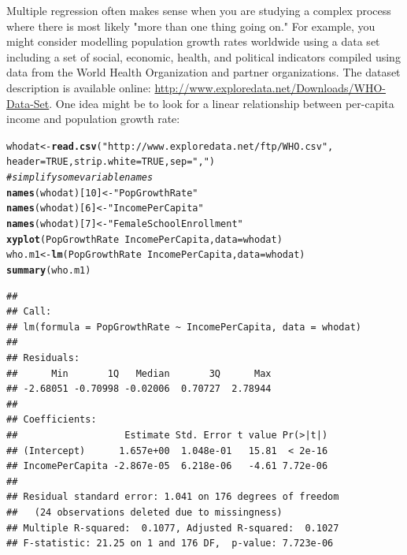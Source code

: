 \documentclass[twoside]{book}\usepackage[]{graphicx}\usepackage[]{xcolor}
\makeatletter
\newcommand{\hlnum}[1]{\textcolor[rgb]{0.686,0.059,0.569}{#1}}%
\newcommand{\hlstr}[1]{\textcolor[rgb]{0.192,0.494,0.8}{#1}}%
\newcommand{\hlcom}[1]{\textcolor[rgb]{0.678,0.584,0.686}{\textit{#1}}}%
\newcommand{\hlopt}[1]{\textcolor[rgb]{0,0,0}{#1}}%
\newcommand{\hlstd}[1]{\textcolor[rgb]{0.345,0.345,0.345}{#1}}%
\newcommand{\hlkwb}[1]{\textcolor[rgb]{0.69,0.353,0.396}{#1}}%
\newcommand{\hlkwc}[1]{\textcolor[rgb]{0.333,0.667,0.333}{#1}}%
\newcommand{\hlkwd}[1]{\textcolor[rgb]{0.737,0.353,0.396}{\textbf{#1}}}%
\newenvironment{kframe}{%
 \def\at@end@of@kframe{}%
 \ifinner\ifhmode%
  \def\at@end@of@kframe{\end{minipage}}%
  \begin{minipage}{\columnwidth}%
 \fi\fi%
 \def\FrameCommand##1{\hskip\@totalleftmargin \hskip-\fboxsep
 \colorbox{shadecolor}{##1}\hskip-\fboxsep
     \hskip-\linewidth \hskip-\@totalleftmargin \hskip\columnwidth}%
 \MakeFramed {\advance\hsize-\width
   \@totalleftmargin\z@ \linewidth\hsize
   \@setminipage}}%
 {\par\unskip\endMakeFramed%
 \at@end@of@kframe}
\newenvironment{knitrout}{}{} %
\newcounter{example}[section]
\makeatother
\begin{document}
Multiple regression often makes sense when you are studying a complex process where there is most likely "more than one thing going on."  For example, you might consider modelling population growth rates worldwide using a data set including a set of social, economic, health, and political indicators compiled using data from the World Health Organization and partner organizations. The dataset description is available online: \url{http://www.exploredata.net/Downloads/WHO-Data-Set}.  One idea might be to look for a linear relationship between per-capita income and population growth rate:
\begin{knitrout}
\color{fgcolor}\begin{kframe}
\begin{alltt}
\hlstd{whodat} \hlkwb{<-} \hlkwd{read.csv}\hlstd{(}\hlstr{"http://www.exploredata.net/ftp/WHO.csv"}\hlstd{,}
                   \hlkwc{header}\hlstd{=}\hlnum{TRUE}\hlstd{,} \hlkwc{strip.white}\hlstd{=}\hlnum{TRUE}\hlstd{,} \hlkwc{sep}\hlstd{=}\hlstr{","}\hlstd{)}
\hlcom{#simplify some variable names}
\hlkwd{names}\hlstd{(whodat)[}\hlnum{10}\hlstd{]} \hlkwb{<-} \hlstr{"PopGrowthRate"}
\hlkwd{names}\hlstd{(whodat)[}\hlnum{6}\hlstd{]} \hlkwb{<-} \hlstr{"IncomePerCapita"}
\hlkwd{names}\hlstd{(whodat)[}\hlnum{7}\hlstd{]} \hlkwb{<-} \hlstr{"FemaleSchoolEnrollment"}
\hlkwd{xyplot}\hlstd{(PopGrowthRate}\hlopt{~}\hlstd{IncomePerCapita,} \hlkwc{data}\hlstd{=whodat)}
\hlstd{who.m1} \hlkwb{<-} \hlkwd{lm}\hlstd{(PopGrowthRate}\hlopt{~}\hlstd{IncomePerCapita ,} \hlkwc{data}\hlstd{=whodat)}
\hlkwd{summary}\hlstd{(who.m1)}
\end{alltt}
\begin{verbatim}
## 
## Call:
## lm(formula = PopGrowthRate ~ IncomePerCapita, data = whodat)
## 
## Residuals:
##      Min       1Q   Median       3Q      Max 
## -2.68051 -0.70998 -0.02006  0.70727  2.78944 
## 
## Coefficients:
##                   Estimate Std. Error t value Pr(>|t|)
## (Intercept)      1.657e+00  1.048e-01   15.81  < 2e-16
## IncomePerCapita -2.867e-05  6.218e-06   -4.61 7.72e-06
## 
## Residual standard error: 1.041 on 176 degrees of freedom
##   (24 observations deleted due to missingness)
## Multiple R-squared:  0.1077,	Adjusted R-squared:  0.1027 
## F-statistic: 21.25 on 1 and 176 DF,  p-value: 7.723e-06
\end{verbatim}
\end{kframe}


\end{knitrout}
\end{document}
